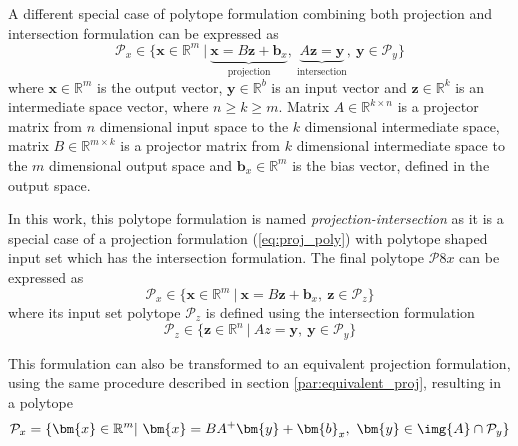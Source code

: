 A different special case of polytope formulation combining both projection and intersection formulation can be expressed as 
\begin{equation}
    \mathcal{P}_x \in \{\bm{x}\in \mathbb{R}^m~|~ \underbrace{\bm{x} = B \bm{z} + \bm{b}_x}_{\text{projection}},~ \underbrace{A\bm{z}=\bm{y}}_{\text{intersection}},~ \bm{y} \in \mathcal{P}_y\} 
    \label{eq:proj_inter_poly}
\end{equation}
where $\bm{x}\in\mathbb{R}^m$ is the output vector, $\bm{y} \in \mathbb{R}^b$ is an input vector and $\bm{z}\in\mathbb{R}^k$ is an intermediate space vector, where $n\!\geq\!k\!\geq\!m$. Matrix $A\in \mathbb{R}^{k \times n}$ is a projector matrix from $n$ dimensional input space to the $k$ dimensional intermediate space, matrix $B\in \mathbb{R}^{m\times k}$ is a projector matrix from $k$ dimensional intermediate space to the $m$ dimensional output space and $\bm{b}_x\in\mathbb{R}^m$ is the bias vector, defined in the output space.

In this work, this polytope formulation is named \textit{projection-intersection} as it is a special case of a projection formulation (\ref{eq:proj_poly}) with polytope shaped input set which has the intersection formulation. The final polytope $\mathcal{P}8x$ can be expressed as
\begin{equation}
    \mathcal{P}_x \in \{\bm{x}\in \mathbb{R}^m~|~ \bm{x} = B\bm{z} + \bm{b}_x,~ \bm{z} \in \mathcal{P}_z\} 
\end{equation}
where its input set polytope $\mathcal{P}_z$ is defined using the intersection formulation
\begin{equation}
    \mathcal{P}_z \in \{\bm{z}\in \mathbb{R}^n~|~Az = \bm{y},~ \bm{y} \in \mathcal{P}_y\} 
\end{equation}

This formulation can also be transformed to an equivalent projection formulation, using the same procedure described in section \ref{par:equivalent_proj}, resulting in a polytope 
\begin{equation}
\mathcal{P}_x=\{\bm{x} \in \mathbb{R}^m |~ \bm{x} = BA^+\bm{y} + \bm{b}_x,~ \bm{y}\in \img{A}\cap\mathcal{P}_y\} 
\end{equation}

